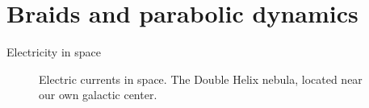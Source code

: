 \documentclass[9pt, english]{beamer}
\theoremstyle{definition}
\begin{document}

\section{Braids and parabolic dynamics}



\begin{frame}{Electricity in space}
\begin{figure}\label{fig:nebula}
        \caption{Electric currents in space. The Double Helix nebula, located near
        our own galactic center.}
        \end{figure}
\end{frame}
\end{document}
